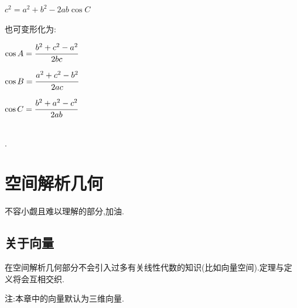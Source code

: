 \documentclass[UTF8,12pt]{ctexbook}
\begin{document}
{{{  $c^2 = a^2 + b^2 - 2ab\cos C$

  也可变形化为:

  $\cos A = \cfrac{b^2 + c^2 - a^2}{2bc}$

  $\cos B = \cfrac{a^2 + c^2 - b^2}{2ac}$

  $\cos C = \cfrac{b^2 + a^2 - c^2}{2ab}$
}%
\\

.

}%

\section{空间解析几何}{
  不容小觑且难以理解的部分,加油.

  \subsection{关于向量}{
    在空间解析几何部分不会引入过多有关线性代数的知识(比如向量空间).定理与定义将会互相交织.

    注:本章中的向量默认为三维向量.

}}}
\end{document}
